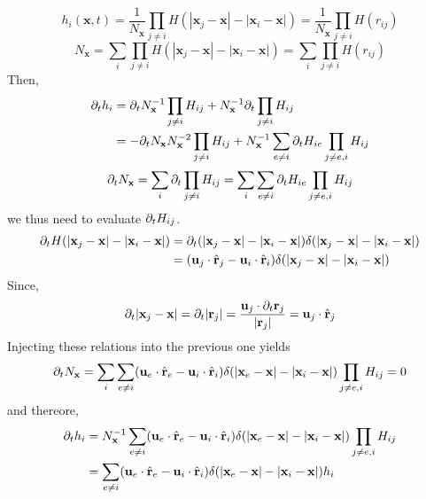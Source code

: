 \begin{equation*}
    h_{i}(\textbf{x},t) 
    = \frac{1}{N_\textbf{x}}
    \prod_{j \neq i}
    H(|\textbf{x}_j - \textbf{x}| - |\textbf{x}_i - \textbf{x}|)
    = \frac{1}{N_\textbf{x}}
    \prod_{j \neq i}
    H(r_{ij})
\end{equation*}
\begin{equation*}
    N_\textbf{x}
    = 
    \sum_{i}
    \prod_{j\neq i}
    H(|\textbf{x}_j - \textbf{x}| - |\textbf{x}_i - \textbf{x}|)
    = 
    \sum_{i}
    \prod_{j\neq i}
    H(r_{ij})
\end{equation*}
Then, 
\begin{align*}
    \partial_t h_i
    &= 
    \partial_t N_\textbf{x}^{-1} \prod_{j\neq i} H_{ij}
    + N_\textbf{x}^{-1} \partial_t \prod_{j\neq i} H_{ij}\\
    &= 
    - \partial_t N_\textbf{x} N_\textbf{x}^{-2} \prod_{j\neq i} H_{ij}
    + N_\textbf{x}^{-1} \sum_{e \neq i} \partial_t H_{ie} \prod_{j\neq e,i} H_{ij}
\end{align*}
\begin{align*}
    \partial_t N_\textbf{x}
    = \sum_{i}
    \partial_t 
    \prod_{j\neq i}
    H_{ij}
    = \sum_{i}
    \sum_{e\neq i}
    \partial_t 
    H_{ie}
    \prod_{j\neq e,i}
    H_{ij}
\end{align*}
we thus need to evaluate $\partial_t H_{ij}$. 
\begin{align*}
    \partial_t H(|\textbf{x}_j - \textbf{x}| - |\textbf{x}_i - \textbf{x}|)
    &= \partial_t (|\textbf{x}_j - \textbf{x}| - |\textbf{x}_i - \textbf{x}|) 
    \delta(|\textbf{x}_j - \textbf{x}| - |\textbf{x}_i - \textbf{x}|)\\
    &= (\textbf{u}_j \cdot \hat{\textbf{r}}_j - \textbf{u}_i \cdot \hat{\textbf{r}}_i)
    \delta(|\textbf{x}_j - \textbf{x}| - |\textbf{x}_i - \textbf{x}|)
\end{align*}
Since, 
\begin{equation*}
    \partial_t |\textbf{x}_j - \textbf{x}| 
    = \partial_t |\textbf{r}_j|
    = \frac{\textbf{u}_j \cdot  \partial_t \textbf{r}_j}{|\textbf{r}_j|}
    = \textbf{u}_j \cdot \hat{\textbf{r}}_j
\end{equation*}
Injecting these relations into the previous one yields
\begin{align*}
    \partial_t N_\textbf{x}
    = \sum_{i}
    \sum_{e\neq i}
    (\textbf{u}_e \cdot \hat{\textbf{r}}_e - \textbf{u}_i \cdot \hat{\textbf{r}}_i)
    \delta(|\textbf{x}_e - \textbf{x}| - |\textbf{x}_i - \textbf{x}|)
    \prod_{j\neq e,i}
    H_{ij}
    = 0 
\end{align*}
and thereore, 
\begin{align*}
    \partial_t h_i
    &=
    N_\textbf{x}^{-1} \sum_{e \neq i} (\textbf{u}_e \cdot \hat{\textbf{r}}_e - \textbf{u}_i \cdot \hat{\textbf{r}}_i)
    \delta(|\textbf{x}_e - \textbf{x}| - |\textbf{x}_i - \textbf{x}|) \prod_{j\neq e,i} H_{ij}\\
    &=
    \sum_{e \neq i} (\textbf{u}_e \cdot \hat{\textbf{r}}_e - \textbf{u}_i \cdot \hat{\textbf{r}}_i)
    \delta(|\textbf{x}_e - \textbf{x}| - |\textbf{x}_i - \textbf{x}|) h_i
\end{align*}



